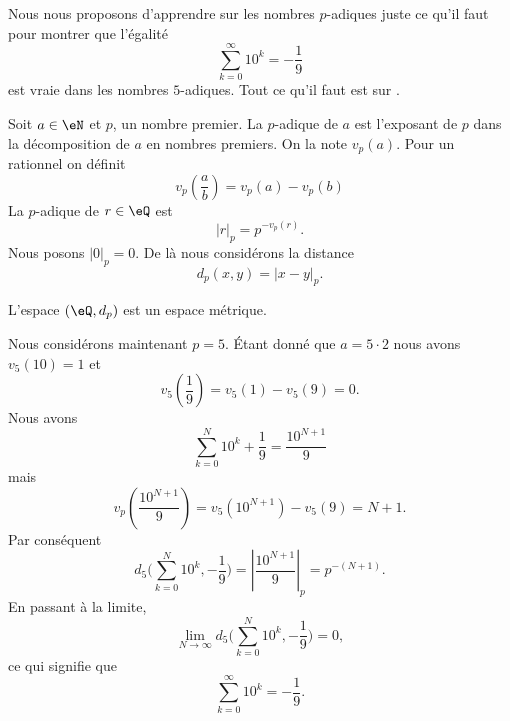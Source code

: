 Nous nous proposons d'apprendre sur les nombres \( p\)-adiques juste ce qu'il faut pour montrer que l'égalité
\begin{equation}
    \sum_{k=0}^{\infty}10^k=-\frac{1}{ 9 }
\end{equation}
est vraie dans les nombres \( 5\)-adiques. Tout ce qu'il faut est sur .

Soit \( a\in \eN\) et \( p\), un nombre premier. La  \( p\)-adique de \( a\) est l'exposant de \( p\) dans la décomposition de \( a\) en nombres premiers. On la note \( v_p(a)\). Pour un rationnel on définit
\begin{equation}
    v_p\left( \frac{ a }{ b } \right)=v_p(a)-v_p(b)
\end{equation}
La  \( p\)-adique de \( r\in \eQ\) est 
\begin{equation}
    | r |_p=p^{-v_p(r)}.
\end{equation}
Nous posons \( | 0 |_p=0\). De là nous considérons la distance
\begin{equation}
    d_p(x,y)=| x-y |_p.
\end{equation}

\begin{lemma}
    L'espace \( (\eQ,d_p)\) est un espace métrique.
\end{lemma}

Nous considérons maintenant \( p=5\). Étant donné que \( a=5\cdot 2\) nous avons \( v_5(10)=1\) et
\begin{equation}
    v_5\left( \frac{1}{ 9 } \right)=v_5(1)-v_5(9)=0.
\end{equation}
Nous avons
\begin{equation}
    \sum_{k=0}^N10^k+\frac{1}{ 9 }=\frac{ 10^{N+1} }{ 9 }
\end{equation}
mais
\begin{equation}
    v_p\left( \frac{ 10^{N+1} }{ 9 } \right)=v_5(10^{N+1})-v_5(9)=N+1.
\end{equation}
Par conséquent
\begin{equation}
    d_5\big( \sum_{k=0}^N10^k,-\frac{1}{ 9 } \big)=| \frac{ 10^{N+1} }{ 9 } |_p=p^{-(N+1)}.
\end{equation}
En passant à la limite,
\begin{equation}
    \lim_{N\to \infty} d_5\big( \sum_{k=0}^N10^k,-\frac{1}{ 9 } \big)=0,
\end{equation}
ce qui signifie que
\begin{equation}
    \sum_{k=0}^{\infty}10^k=-\frac{1}{ 9 }.
\end{equation}
